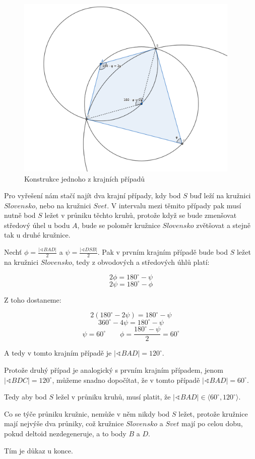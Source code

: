 \documentclass{fkssolpub}
\author{Ondřej Sedláček}
\renewcommand{\angle}{\sphericalangle}
\begin{document}
\begin{figure}
  \begin{center}
    \includegraphics[width=0.95\textwidth]{1-fig.png}
  \end{center}
  \caption{Konstrukce jednoho z krajních případů}\label{fig:}
\end{figure}


Pro vyřešení nám stačí najít dva krajní případy, kdy bod $S$ buď leží na kružnici $Slovensko$, nebo na kružnici $Svet$. V intervalu mezi těmito případy pak musí nutně bod $S$ ležet v průniku těchto kruhů, protože když se bude zmenšovat středový úhel u bodu $A$, bude se poloměr kružnice $Slovensko$ zvětšovat a stejně tak u druhé kružnice.

Nechť $\phi = \frac{|\angle BAD|}{2}$ a $\psi = \frac{|\angle DSB|}{2}$. Pak v prvním krajním případě bude bod $S$ ležet na kružnici $Slovensko$, tedy z obvodových a středových úhlů platí:

\[
  2 \phi = 180^{\circ} - \psi
\]
\[
  2 \psi = 180^{\circ} - \phi
\]

Z toho dostaneme:

\[
  2 (180^{\circ} - 2 \psi) = 180^{\circ} - \psi
\]
\[
  360^{\circ} - 4 \psi = 180^{\circ} - \psi
\]
\[
  \psi = 60^{\circ} \qquad \phi = \frac{180^{\circ} - \psi}{2} = 60^{\circ}
\]

A tedy v tomto krajním případě je $|\angle BAD| = 120^{\circ}$.

Protože druhý případ je analogický s prvním krajním případem, jenom $|\angle BDC| = 120^{\circ}$, můžeme snadno dopočítat, že v tomto případě $|\angle BAD| = 60^{\circ}$.

Tedy aby bod $S$ ležel v průniku kruhů, musí platit, že $|\angle BAD| \in \langle 60^{\circ}, 120^{\circ} \rangle$.

Co se týče průniku kružnic, nemůže v něm nikdy bod $S$ ležet, protože kružnice mají nejvýše dva průniky, což kružnice $Slovensko$ a $Svet$ mají po celou dobu, pokud deltoid nezdegeneruje, a to body $B$ a $D$.

Tím je důkaz u konce.
\end{document}
